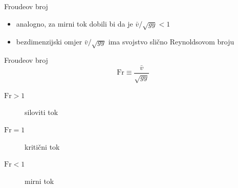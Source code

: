 \documentclass{beamer}
\begin{document}
\begin{frame}{Froudeov broj}

\begin{itemize}
\item analogno, za mirni tok dobili bi da je $\bar{v}/\sqrt{gy}<1$
\item bezdimenzijski omjer $\bar{v}/\sqrt{gy}$ ima svojstvo slično Reynoldsovom
broju 
\end{itemize}
\begin{alertblock}{Froudeov broj}
\[
\mathrm{Fr}\equiv\frac{\bar{v}}{\sqrt{gy}}
\]

\begin{description}
\item [{$\mathrm{Fr}>1$}] siloviti tok
\item [{$\mathrm{Fr}=1$}] kritični tok
\item [{$\mathrm{Fr}<1$}] mirni tok\bigskip{}
\end{description}
\end{alertblock}
\end{frame}
\end{document}
